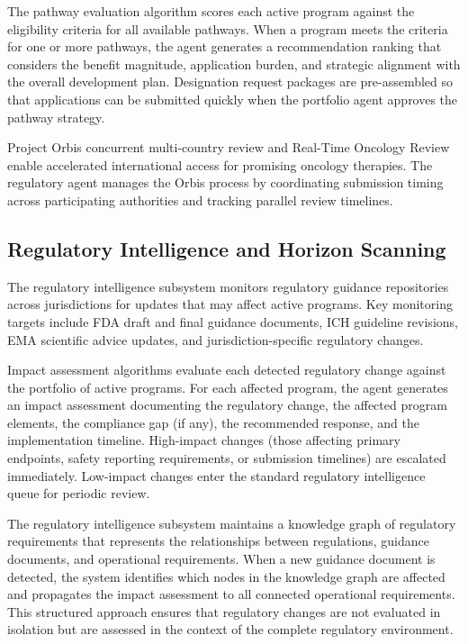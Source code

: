 The pathway evaluation algorithm scores each active program against the eligibility criteria
for all available pathways. When a program meets the criteria for one or more pathways, the
agent generates a recommendation ranking that considers the benefit magnitude, application
burden, and strategic alignment with the overall development plan. Designation request
packages are pre-assembled so that applications can be submitted quickly when the portfolio
agent approves the pathway strategy.

Project Orbis \cite{fda-project-optimus} concurrent multi-country review and Real-Time
Oncology Review enable accelerated international access for promising oncology therapies.
The regulatory agent manages the Orbis process by coordinating submission timing across
participating authorities and tracking parallel review timelines.

\subsection{Regulatory Intelligence and Horizon Scanning}

The regulatory intelligence subsystem monitors regulatory guidance repositories across
jurisdictions for updates that may affect active programs. Key monitoring targets include
FDA draft and final guidance documents, ICH guideline revisions, EMA scientific advice
updates, and jurisdiction-specific regulatory changes.

Impact assessment algorithms evaluate each detected regulatory change against the portfolio
of active programs. For each affected program, the agent generates an impact assessment
documenting the regulatory change, the affected program elements, the compliance gap (if
any), the recommended response, and the implementation timeline. High-impact changes (those
affecting primary endpoints, safety reporting requirements, or submission timelines) are
escalated immediately. Low-impact changes enter the standard regulatory intelligence queue
for periodic review.

The regulatory intelligence subsystem maintains a knowledge graph of regulatory requirements
that represents the relationships between regulations, guidance documents, and operational
requirements. When a new guidance document is detected, the system identifies which nodes in
the knowledge graph are affected and propagates the impact assessment to all connected
operational requirements. This structured approach ensures that regulatory changes are not
evaluated in isolation but are assessed in the context of the complete regulatory environment.

